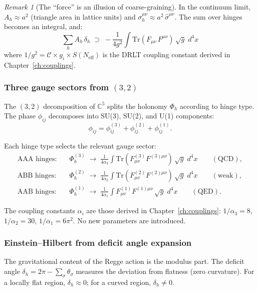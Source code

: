 \documentclass[12pt]{article}
\theoremstyle{remark}
\newtheorem{remark}[theorem]{Remark}
\theoremstyle{definition}
\newcommand{\CC}{\mathbb{C}}
\begin{document}
\begin{remark}[The ``force'' is an illusion of coarse-graining]
In the continuum limit, $A_h \approx a^2$ (triangle area in lattice units) and $\sigma^{\mu\nu}_h \approx a^2\,\hat{\sigma}^{\mu\nu}$.  The sum over hinges becomes an integral, and:
\begin{equation}
\boxed{\sum_h A_h\,\delta_h \;\supset\; -\frac{1}{4g^2}\int \text{Tr}(F_{\mu\nu}\,F^{\mu\nu})\,\sqrt{g}\;d^4x}
\end{equation}
where $1/g^2 = \mathcal{C} \times g_i \times S(N_\text{eff})$ is the DRLT coupling constant derived in Chapter~\ref{ch:couplings}.

\subsubsection{Three gauge sectors from $(3,2)$}

The $(3,2)$ decomposition of $\CC^5$ splits the holonomy $\Phi_h$ according to hinge type.  The phase $\phi_{ij}$ decomposes into SU(3), SU(2), and U(1) components:
\begin{equation}
\phi_{ij} = \phi^{(3)}_{ij} + \phi^{(2)}_{ij} + \phi^{(1)}_{ij}.
\end{equation}

Each hinge type selects the relevant gauge sector:
\begin{align}
\text{AAA hinges:} &\quad \Phi^{(3)}_h \;\to\; \frac{1}{4\alpha_3}\int\text{Tr}(F^{(3)}_{\mu\nu}F^{(3)\mu\nu})\,\sqrt{g}\;d^4x \qquad (\text{QCD}), \\
\text{ABB hinges:} &\quad \Phi^{(2)}_h \;\to\; \frac{1}{4\alpha_2}\int\text{Tr}(F^{(2)}_{\mu\nu}F^{(2)\mu\nu})\,\sqrt{g}\;d^4x \qquad (\text{weak}), \\
\text{AAB hinges:} &\quad \Phi^{(1)}_h \;\to\; \frac{1}{4\alpha_1}\int F^{(1)}_{\mu\nu}F^{(1)\mu\nu}\,\sqrt{g}\;d^4x \qquad (\text{QED}).
\end{align}

The coupling constants $\alpha_i$ are those derived in Chapter~\ref{ch:couplings}: $1/\alpha_3 = 8$, $1/\alpha_2 = 30$, $1/\alpha_1 = 6\pi^2$.  No new parameters are introduced.

\subsubsection{Einstein--Hilbert from deficit angle expansion}

The gravitational content of the Regge action is the modulus part.  The deficit angle $\delta_h = 2\pi - \sum_\sigma \theta_\sigma$ measures the deviation from flatness (zero curvature).  For a locally flat region, $\delta_h \approx 0$; for a curved region, $\delta_h \ne 0$.


\end{remark}
\end{document}
